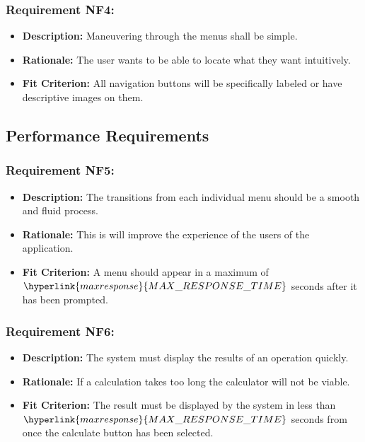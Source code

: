 \documentclass[12pt, titlepage]{article}
\begin{document}
\subsubsection*{Requirement NF4:}
\begin{itemize}
  \item \textbf{Description:} Maneuvering through the menus shall be simple.
  \item \textbf{Rationale:} The user wants to be able to locate what they want intuitively.
  \item \textbf{Fit Criterion:} All navigation buttons will be specifically labeled or have descriptive images on them.
\end{itemize}


\subsection{Performance Requirements}
\subsubsection*{Requirement NF5:}
\begin{itemize}
  \item \textbf{Description:} The transitions from each individual menu should be a smooth and fluid process.
  \item \textbf{Rationale:} This is will improve the experience of the users of the application.
  \item \textbf{Fit Criterion:} A menu should appear in a maximum of $\hyperlink{maxresponse}{MAX\_RESPONSE\_TIME}$ seconds after it has been prompted.
\end{itemize}

\subsubsection*{Requirement NF6:}
\begin{itemize}
  \item \textbf{Description:} The system must display the results of an operation quickly.
  \item \textbf{Rationale:} If a calculation takes too long the calculator will not be viable.
  \item \textbf{Fit Criterion:} The result must be displayed by the system in less than $\hyperlink{maxresponse}{MAX\_RESPONSE\_TIME}$ seconds from once the calculate button has been selected.
\end{itemize}
\end{document}
